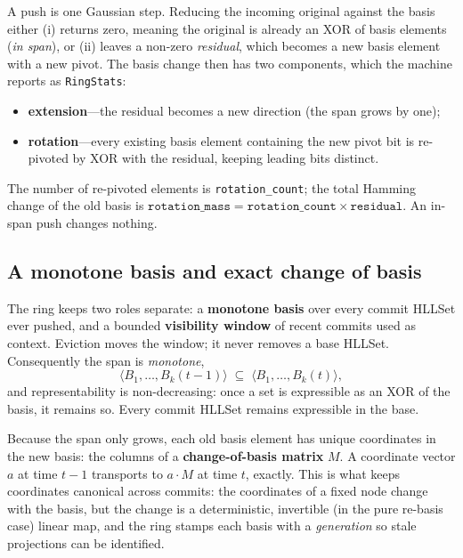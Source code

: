\documentclass[11pt,a4paper]{article}
\theoremstyle{remark}
\newcommand{\spanof}[1]{\ensuremath{\langle #1\rangle}} %
\begin{document}
A push is one Gaussian step. Reducing the incoming original against the basis
either (i) returns zero, meaning the original is already an XOR of basis
elements (\emph{in span}), or (ii) leaves a non-zero \emph{residual}, which
becomes a new basis element with a new pivot. The basis change then has two
components, which the machine reports as \texttt{RingStats}:
\begin{itemize}[leftmargin=*,nosep]
  \item \textbf{extension}---the residual becomes a new direction (the span
    grows by one);
  \item \textbf{rotation}---every existing basis element containing the new
    pivot bit is re-pivoted by XOR with the residual, keeping leading bits
    distinct.
\end{itemize}
The number of re-pivoted elements is \texttt{rotation\_count}; the total Hamming
change of the old basis is
$\texttt{rotation\_mass} = \texttt{rotation\_count}\times\texttt{residual}$.
An in-span push changes nothing.

\subsection{A monotone basis and exact change of basis}
\label{sec:changeofbasis}

The ring keeps two roles separate: a \textbf{monotone basis} over
every commit HLLSet ever pushed, and a bounded \textbf{visibility window} of
recent commits used as context. Eviction moves the window; it never removes a
base HLLSet. Consequently the span is \emph{monotone},
\begin{equation}
\label{eq:monotone}
\spanof{B_1,\dots,B_k(t-1)} \;\subseteq\; \spanof{B_1,\dots,B_k(t)},
\end{equation}
and representability is non-decreasing: once a set is expressible as an XOR of
the basis, it remains so. Every commit HLLSet remains expressible in the base.

Because the span only grows, each old basis element has unique coordinates in
the new basis: the columns of a \textbf{change-of-basis matrix} $M$. A
coordinate vector $a$ at time $t{-}1$ transports to $a\cdot M$ at time $t$,
exactly. This is what keeps coordinates canonical across commits: the
coordinates of a fixed node change with the basis, but the change is a
deterministic, invertible (in the pure re-basis case) linear map, and the ring
stamps each basis with a \emph{generation} so stale projections can be
identified.
\end{document}
